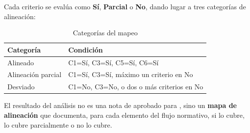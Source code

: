 Cada criterio se eval\'ua como \textbf{S\'i}, \textbf{Parcial} o \textbf{No}, dando lugar a tres categor\'ias de alineaci\'on:

\begin{table}[h]
\centering
\caption{Categor\'ias del mapeo}
\label{tab:categorias}
\begin{tabularx}{\textwidth}{lX}
\toprule
\textbf{Categor\'ia} & \textbf{Condici\'on} \\
\midrule
Alineado & C1=S\'i, C3=S\'i, C5=S\'i, C6=S\'i \\
Alineaci\'on parcial & C1=S\'i, C3=S\'i, m\'aximo un criterio en No \\
Desviado & C1=No, C3=No, o dos o m\'as criterios en No \\
\bottomrule
\end{tabularx}
\end{table}

El resultado del an\'alisis no es una nota de aprobado para \speckit, sino un \textbf{mapa de alineaci\'on} que documenta, para cada elemento del flujo normativo, si \speckit{} lo cubre, lo cubre parcialmente o no lo cubre.
